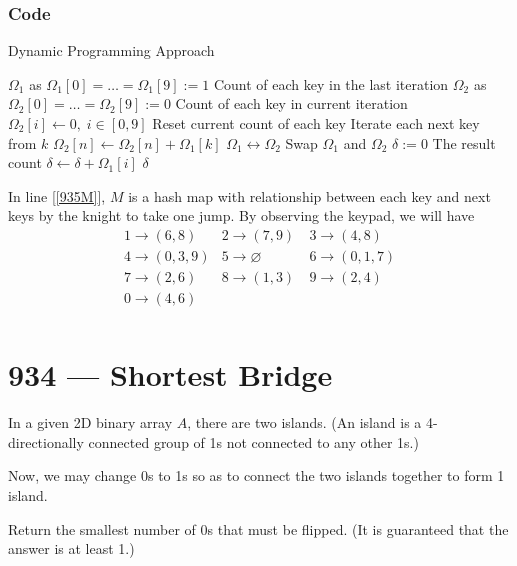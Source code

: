 \documentclass[a4paper,12pt]{article}
\begin{document}
\subsubsection{Code}
\setcounter{algorithm}{0}
\begin{algorithm}[H]
\caption{Dynamic Programming Approach}
\begin{algorithmic}[1]
\State $\Omega_1$ as $\Omega_1[0]=\ldots=\Omega_1[9]:=1$ \Comment Count of each key in the last iteration
\State $\Omega_2$ as $\Omega_2[0]=\ldots=\Omega_2[9]:=0$ \Comment Count of each key in current iteration
\State $\Omega_2[i] \gets 0, \; i\in [0,9]$ \Comment Reset current count of each key
 \Comment Iterate each next key from $k$ \label{935M}
\State $\Omega_2[n] \gets \Omega_2[n] + \Omega_1[k]$
\EndFor
\EndFor
\State $\Omega_1 \leftrightarrow \Omega_2$ \Comment Swap $\Omega_1$ and $\Omega_2$
\EndFor
\State $\delta:=0$ \Comment The result count
\State $\delta\gets\delta+\Omega_1[i]$
\EndFor
\State \Return $\delta$
\EndProcedure
\end{algorithmic}
\end{algorithm}
In line [\ref{935M}], $M$ is a hash map with relationship between each key and next keys by the knight to take one jump. By observing the keypad, we will have
\[
\begin{array}{lll}
1 \longrightarrow (6, 8) & 2 \longrightarrow (7, 9)\ & 3 \longrightarrow (4, 8) \\
4 \longrightarrow (0,3,9) & 5 \longrightarrow \varnothing & 6 \longrightarrow (0,1,7) \\
7 \longrightarrow (2,6) & 8 \longrightarrow (1,3) & 9 \longrightarrow (2,4) \\
0 \longrightarrow (4,6) & & \\
\end{array}
\]

\section{934 --- Shortest Bridge}
In a given 2D binary array $A$, there are two islands.  (An island is a 4-directionally connected group of 1s not connected to any other 1s.)
\par
Now, we may change 0s to 1s so as to connect the two islands together to form 1 island.
\par
Return the smallest number of 0s that must be flipped.  (It is guaranteed that the answer is at least 1.)
\end{document}
